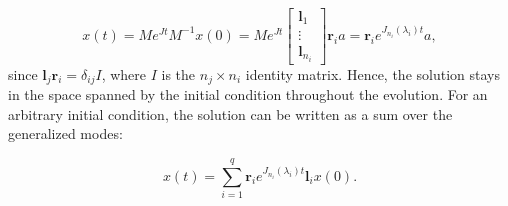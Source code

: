 \documentclass[../main.tex]{subfiles}
\begin{document}
\begin{equation}\label{genmode}
    x(t) = Me^{Jt}M^{-1}x(0) = Me^{Jt} \begin{bmatrix} \boldsymbol{l}_1 \\ \vdots \\ \boldsymbol{l}_{n_i} \end{bmatrix} \boldsymbol{r}_ia = \boldsymbol{r}_i e^{J_{n_i}(\lambda_i)t} a,
\end{equation}
since $\boldsymbol{l}_j\boldsymbol{r}_i = \delta_{ij}I$, where $I$ is the $n_j\times n_i$ identity matrix. Hence, the solution stays in the space spanned by the initial condition throughout the evolution. For an arbitrary initial condition, the solution can be written as a sum over the generalized modes: 

\begin{equation}
    x(t) = \sum_{i=1}^q \boldsymbol{r}_i e^{J_{n_i}(\lambda_i)t} \boldsymbol{l}_i x(0).
\end{equation}
\end{document}
